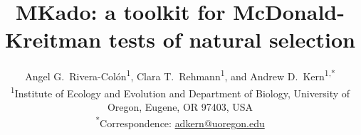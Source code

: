 \documentclass[11pt]{article}
\begin{document}
\title{MKado: a toolkit for McDonald-Kreitman tests of natural selection}
\author{Angel G.\ Rivera-Col\'{o}n\textsuperscript{1},
  Clara T.\ Rehmann\textsuperscript{1},
  and Andrew D.\ Kern\textsuperscript{1,*}\\[4pt]
  \small\textsuperscript{1}Institute of Ecology and Evolution and Department of Biology,
  University of Oregon, Eugene, OR 97403, USA\\
  \small\textsuperscript{*}Correspondence: \href{mailto:adkern@uoregon.edu}{adkern@uoregon.edu}}
\date{}

\maketitle












\end{document}
